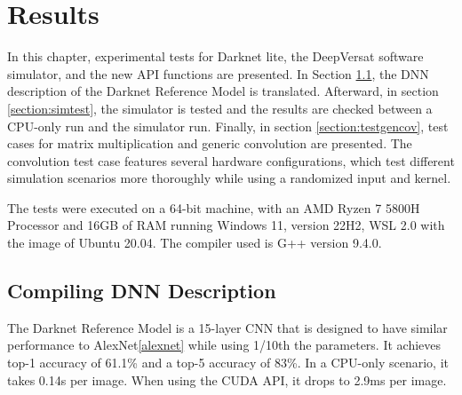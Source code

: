
\chapter{Results}
\label{chapter:results}

In this chapter, experimental tests for Darknet lite, the DeepVersat software simulator, and the new API functions are presented.
In Section \ref{section:DNNDescription}, the DNN description of the Darknet Reference Model is translated. 
Afterward, in section \ref{section:simtest}, the simulator is tested and the results are checked between a CPU-only run and the simulator run. 
Finally, in section \ref{section:testgencov}, test cases for matrix
multiplication and generic convolution are presented. The convolution test case
features several hardware configurations, which test different simulation
scenarios more thoroughly while using a randomized input and kernel. 

The tests were executed on a 64-bit machine, with an AMD Ryzen 7 5800H Processor
and 16GB of RAM running Windows 11, version 22H2, WSL 2.0 with the image of
Ubuntu 20.04. The compiler used is G++ version 9.4.0.



\section{Compiling DNN Description}
\label{section:DNNDescription}

The Darknet Reference Model is a 15-layer CNN that is designed to have similar performance to AlexNet\ref{alexnet} while using 1/10th the parameters. 
It achieves top-1 accuracy of 61.1\% and a top-5 accuracy of 83\%. In a CPU-only scenario, it takes 0.14s per image. When using the CUDA API, it drops to 2.9ms per image.

